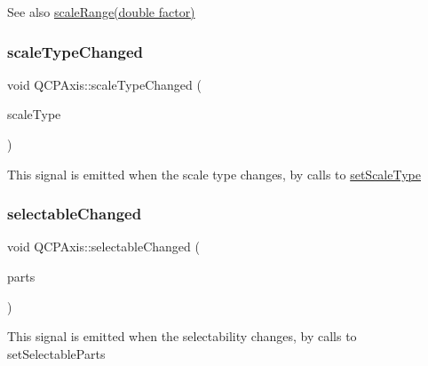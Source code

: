 \begin{DoxySeeAlso}{See also}
\hyperlink{class_q_c_p_axis_a31d18ddf3a4f21ceb077db8ae5b69856}{scale\+Range(double factor)} 
\end{DoxySeeAlso}
\mbox{\label{class_q_c_p_axis_a3505ed8a93bd2e349d858d84996bf767}} 
\subsubsection{\texorpdfstring{scale\+Type\+Changed}{scaleTypeChanged}}
{\footnotesize\ttfamily void Q\+C\+P\+Axis\+::scale\+Type\+Changed (\begin{DoxyParamCaption}\item[{\hyperlink{class_q_c_p_axis_a36d8e8658dbaa179bf2aeb973db2d6f0}{Q\+C\+P\+Axis\+::\+Scale\+Type}}]{scale\+Type }\end{DoxyParamCaption})\hspace{0.3cm}{\ttfamily [signal]}}

This signal is emitted when the scale type changes, by calls to \hyperlink{class_q_c_p_axis_adef29cae617af4f519f6c40d1a866ca6}{set\+Scale\+Type} \mbox{\label{class_q_c_p_axis_aa5ff1fd851139028a3bb4efcb31de9fc}} 
\subsubsection{\texorpdfstring{selectable\+Changed}{selectableChanged}}
{\footnotesize\ttfamily void Q\+C\+P\+Axis\+::selectable\+Changed (\begin{DoxyParamCaption}\item[{const Q\+C\+P\+Axis\+::\+Selectable\+Parts \&}]{parts }\end{DoxyParamCaption})\hspace{0.3cm}{\ttfamily [signal]}}

This signal is emitted when the selectability changes, by calls to set\+Selectable\+Parts \mbox{\label{class_q_c_p_axis_a63b7103c57fe9acfbce164334ea837f8}} 
